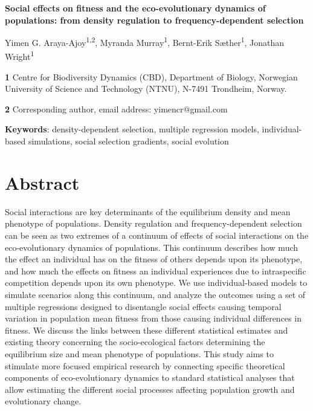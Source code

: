 \documentclass{article}
\begin{document}
\begin{center}
\large
\textbf{Social effects on fitness and the eco-evolutionary dynamics of populations: from density regulation to frequency-dependent selection}
\end{center}

\begin{center}
	Yimen G. Araya-Ajoy\textsuperscript{1,2}, Myranda Murray\textsuperscript{1},  Bernt-Erik Sæther\textsuperscript{1}, Jonathan Wright\textsuperscript{1}
\end{center}

\bigskip
\textbf{1} Centre for Biodiversity Dynamics (CBD), Department of Biology, Norwegian University of Science and Technology (NTNU), N-7491 Trondheim, Norway.

\bigskip
\textbf{2} Corresponding author, email address: yimencr@gmail.com

\bigskip
\textbf{Keywords}: density-dependent selection, multiple regression models, individual-based simulations, social selection gradients, social evolution

\newpage
\section{Abstract}
Social interactions are key determinants of the equilibrium density and mean phenotype of populations. Density regulation and frequency-dependent selection can be seen as two extremes of a continuum of effects of social interactions on the eco-evolutionary dynamics of populations. This continuum  describes how much the effect an individual has on the fitness of others depends upon its phenotype, and how much the effects on fitness an individual experiences due to intraspecific competition depends upon its own phenotype. We use individual-based models to simulate scenarios along this continuum, and analyze the outcomes using a set of multiple regressions designed to disentangle social effects causing temporal variation in population mean fitness from those causing individual differences in fitness. We discuss the links between these different statistical estimates and existing theory concerning the socio-ecological factors determining the equilibrium size and mean phenotype of populations. This study aims to stimulate more focused empirical research by connecting specific theoretical components of eco-evolutionary dynamics to standard statistical analyses that allow estimating the different social processes affecting population growth and evolutionary change. 
\end{document}
